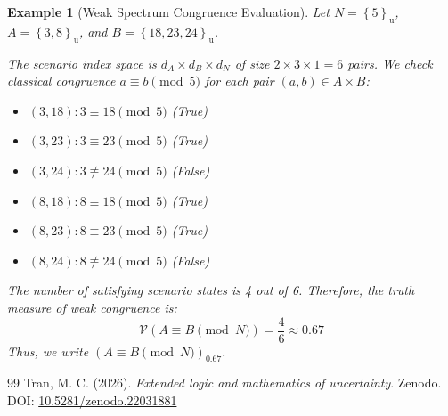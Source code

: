 \documentclass[a4paper,14pt, twoside]{memoir}
\newtheorem{example}{Example}[chapter]
\newcommand{\set}[1]{\left\{#1\right\}} %
\newcommand{\s}[1]{\set{#1}_\mathrm{u}} %
\newcommand{\ddclmd}{\mathcal{V}} %
\newcommand{\gtcl}[2]{\left(#1\right)_{#2}} %
\begin{document}
	\begin{example}[Weak Spectrum Congruence Evaluation]
		Let $N = \s{5}$, $A = \s{3, 8}$, and $B = \s{18, 23, 24}$.
		
		The scenario index space is $d_A \times d_B \times d_N$ of size $2 \times 3 \times 1 = 6$ pairs.
		We check classical congruence $a \equiv b \pmod 5$ for each pair $(a, b) \in A \times B$:
		\begin{itemize}
			\item $(3, 18): 3 \equiv 18 \pmod 5$ (True)
			\item $(3, 23): 3 \equiv 23 \pmod 5$ (True)
			\item $(3, 24): 3 \not\equiv 24 \pmod 5$ (False)
			\item $(8, 18): 8 \equiv 18 \pmod 5$ (True)
			\item $(8, 23): 8 \equiv 23 \pmod 5$ (True)
			\item $(8, 24): 8 \not\equiv 24 \pmod 5$ (False)
		\end{itemize}
		The number of satisfying scenario states is 4 out of 6. Therefore, the truth measure of weak congruence is:
		\[
		\ddclmd(A \equiv B \pmod N) = \frac{4}{6} \approx 0.67
		\]
		Thus, we write $\gtcl{A \equiv B \pmod N}{0.67}$.
	\end{example}
	
	\begin{thebibliography}{99}
		Tran, M. C. (2026). \textit{Extended logic and mathematics of uncertainty}. Zenodo. DOI:
		\href{https://doi.org/10.5281/zenodo.22031881}{10.5281/zenodo.22031881}
	\end{thebibliography}
\end{document}
